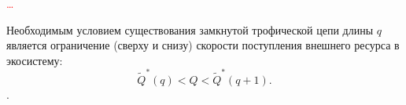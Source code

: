 
    \textcolor{red}{\dots}

    \begin{corollary}
        Необходимым условием существования замкнутой трофической цепи длины \(q\) является ограничение (сверху и снизу) скорости поступления внешнего ресурса в экосистему:
        \begin{equation}
            \widetilde{Q}^*(q) < Q < \widetilde{Q}^*(q+1).
        \end{equation}.
    \end{corollary}
    



